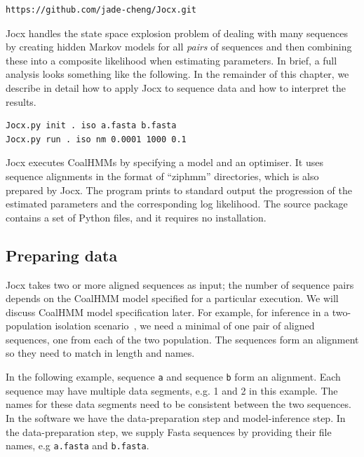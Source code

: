 \documentclass[graybox]{svmult}
\begin{document}
 {\scriptsize{}\begin{verbatim}
https://github.com/jade-cheng/Jocx.git
\end{verbatim}}

Jocx handles the state space explosion problem of dealing with many sequences by creating hidden Markov models for all \emph{pairs} of sequences and then combining these into a composite likelihood when estimating parameters. In brief, a full analysis looks something like the following.  In the remainder of this chapter, we describe in detail how to apply Jocx to sequence data and how to interpret the results.

 {\scriptsize{}\begin{verbatim}
Jocx.py init . iso a.fasta b.fasta
Jocx.py run . iso nm 0.0001 1000 0.1
\end{verbatim}}

Jocx executes CoalHMMs by specifying a model and an optimiser. It uses sequence alignments in the format of ``ziphmm'' directories, which is also prepared by Jocx. The program prints to standard output the progression of the estimated parameters and the corresponding log likelihood. The source package contains a set of Python files, and it requires no installation.


\subsection{Preparing data}

Jocx takes two or more aligned sequences as input; the number of sequence pairs depends on the CoalHMM model specified for a particular execution. We will discuss CoalHMM model specification later. For example, for inference in a two-population isolation scenario~\cite{Mailund:2011dva}, we need a minimal of one pair of aligned sequences, one from each of the two population. The sequences form an alignment so they need to match in length and names.


In the following example, sequence \texttt{a} and sequence \texttt{b} form an alignment.  Each sequence may have multiple data segments, e.g. 1 and 2 in this example.  The names for these data segments need to be consistent between the two sequences.  In the software we have the data-preparation step and model-inference step.  In the data-preparation step, we supply Fasta sequences by providing their file names, e.g \texttt{a.fasta} and \texttt{b.fasta}.
\end{document}
